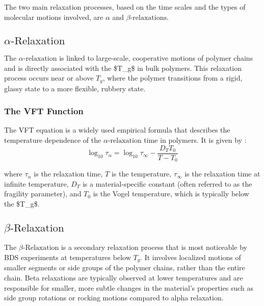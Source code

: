  The two main relaxation processes, based on the time scales and the types of molecular motions involved, are $\alpha$ and $\beta\text{-relaxations}$.

\subsection{$\alpha\text{-Relaxation}$}


The \(\alpha\text{-relaxation}\) is linked to large-scale, cooperative motions of polymer chains and is directly associated with the \ac{$T_g$} in bulk polymers. This relaxation process occurs near or above \(T_g\), where the polymer transitions from a rigid, glassy state to a more flexible, rubbery state. %

\subsubsection{The VFT Function}

The \ac{VFT} equation is a widely used empirical formula that describes the temperature dependence of the $\alpha\text{-relaxation}$ time in polymers. It is given by \cite{levit2019}:
\begin{equation}
\label{vfteq}
\log_{10} \tau_\alpha = \log_{10} \tau_\infty - \frac{D_T T_0}{T - T_0}
\end{equation}

where $\tau_\alpha$ is the relaxation time, $T$ is the temperature, $\tau_\infty$ is the relaxation time at infinite temperature, $D_T$ is a material-specific constant (often referred to as the fragility parameter), and $T_0$ is the Vogel temperature, which is typically below the \ac{$T_g$}.

\subsection{$\beta\text{-Relaxation}$}

The $\beta\text{-Relaxation}$ is a secondary relaxation process that is most noticeable by \ac{BDS} experiments at temperatures below \(T_g\). It involves localized motions of smaller segments or side groups of the polymer chains, rather than the entire chain. Beta relaxations are typically observed at lower temperatures and are responsible for smaller, more subtle changes in the material's properties such as side group rotations or rocking motions compared to alpha relaxation.
